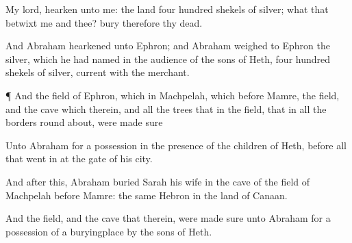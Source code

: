 {My
lord,
hearken unto me: the
land
{}
four
hundred
shekels of
silver; what
{} that
betwixt me and thee?
bury therefore thy
dead.


\par }{\PP {}And
Abraham
hearkened unto
Ephron; and
Abraham
weighed to
Ephron the
silver, which he had
named in the
audience of the
sons of
Heth,
four
hundred
shekels of
silver,
current
{} with the
merchant.


\par }{\PP {}¶ And the
field of
Ephron, which
{} in
Machpelah, which
{}
before
Mamre, the
field, and the
cave which
{} therein, and all the
trees that
{} in the
field, that
{} in all the
borders round
about, were made
sure

Unto
Abraham for a
possession in the
presence of the
children of
Heth, before all that went
in at the
gate of his
city.

And
after
this,
Abraham
buried
Sarah his
wife in the
cave of the
field of
Machpelah
before
Mamre: the same
{}
Hebron in the
land of
Canaan.

And the
field, and the
cave that
{} therein, were made
sure unto
Abraham for a
possession of a
buryingplace by the
sons of
Heth.




\par }
